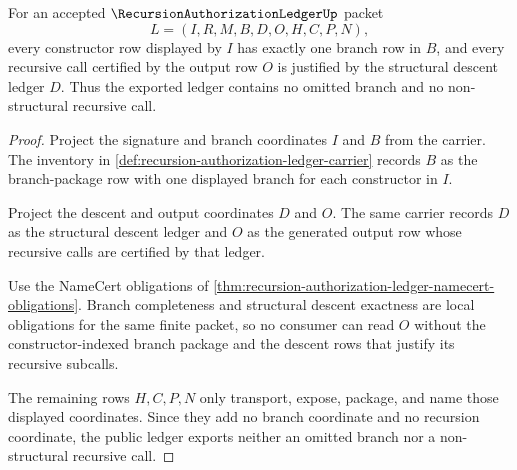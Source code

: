 \begin{theorem}
\label{thm:recursion-authorization-ledger-obligation-branch-completeness}
For an accepted $\RecursionAuthorizationLedgerUp$ packet
$$
L=(I,R,M,B,D,O,H,C,P,N),
$$
every constructor row displayed by $I$ has exactly one branch row in $B$, and every recursive call certified by the output row $O$ is justified by the structural descent ledger $D$. Thus the exported ledger contains no omitted branch and no non-structural recursive call.
\end{theorem}
\begin{proof}
Project the signature and branch coordinates $I$ and $B$ from the carrier. The inventory in \autoref{def:recursion-authorization-ledger-carrier} records $B$ as the branch-package row with one displayed branch for each constructor in $I$.

Project the descent and output coordinates $D$ and $O$. The same carrier records $D$ as the structural descent ledger and $O$ as the generated output row whose recursive calls are certified by that ledger.

Use the NameCert obligations of \autoref{thm:recursion-authorization-ledger-namecert-obligations}. Branch completeness and structural descent exactness are local obligations for the same finite packet, so no consumer can read $O$ without the constructor-indexed branch package and the descent rows that justify its recursive subcalls.

The remaining rows $H,C,P,N$ only transport, expose, package, and name those displayed coordinates. Since they add no branch coordinate and no recursion coordinate, the public ledger exports neither an omitted branch nor a non-structural recursive call.
\end{proof}

